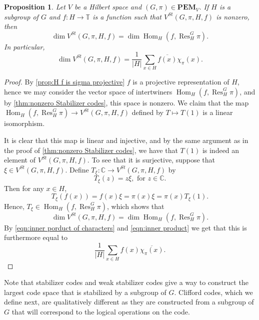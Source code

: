 \documentclass[11pt, oneside, reqno]{amsart}
\newcommand{\bbC}{\mathbb{C}}
\newcommand{\bbT}{\mathbb{T}}
\newcommand{\PEM}{\mathbf{PEM}}
\newcommand{\Hom}{\operatorname{Hom}}
\newcommand{\Res}{\operatorname{Res}}
\theoremstyle{definition}
\theoremstyle{plain}
\newtheorem{proposition}[definition]{Proposition}
\theoremstyle{remark}
\begin{document}
\begin{proposition}\label{prop:dim of weak stabilizer code}
    Let $V$ be a Hilbert space and $(G,\pi) \in \PEM_V$. If $H$ is a subgroup of $G$ and $f \colon H \to \bbT$ is a function such that $V^{St}(G,\pi,H,f)$ is nonzero, then
    \begin{equation*}
        \dim V^{St}(G,\pi,H,f) = \dim \Hom_H(f, \Res^G_H \pi).
    \end{equation*}
    In particular, 
    \begin{equation*}
        \dim V^{St}(G,\pi,H,f) = \frac{1}{|H|} \sum_{x \in H} \overline{f(x)} \chi_\pi(x).
    \end{equation*}
\end{proposition}
\begin{proof}
    By \cref{prop:H f is sigma projective} $f$ is a projective representation of $H$, hence we may consider the vector space of intertwiners $\Hom_H(f, \Res^G_H \pi)$, and by \cref{thm:nonzero Stabilizer codes}, this space is nonzero. We claim that the map $\Hom_H(f, \Res^G_H \pi) \to V^{St}(G,\pi,H,f)$ defined by $T \mapsto T(1)$ is a linear isomorphism. 
    
    It is clear that this map is linear and injective, and by the same argument as in the proof of \cref{thm:nonzero Stabilizer codes}, we have that $T(1)$ is indeed an element of $V^{St}(G,\pi,H,f)$. To see that it is surjective, suppose that $\xi \in V^{St}(G,\pi,H,f)$. Define $T_\xi \colon \bbC \to V^{St}(G,\pi,H,f)$ by
    \begin{equation*}
        T_\xi(z) = z \xi, \text{ for } z \in \bbC.
    \end{equation*}
    Then for any $x \in H$,
    \begin{equation*}
        T_\xi(f(x))
        = f(x) \xi
        = \pi(x) \xi
        = \pi(x) T_\xi(1).
    \end{equation*}
    Hence, $T_\xi \in \Hom_H(f, \Res^G_H \pi)$, which shows that
    \begin{equation*}
        \dim V^{St}(G,\pi,H,f) = \dim \Hom_H(f, \Res^G_H \pi).
    \end{equation*}
    By \cref{eqn:inner porduct of characters} and \cref{eqn:inner product} we get that this is furthermore equal to
    \begin{equation*}
        \frac{1}{|H|} \sum_{x \in H}f(x)\overline{\chi_\pi(x)}.
    \end{equation*}
\end{proof}

Note that stabilizer codes and weak stabilizer codes give a way to construct the largest code space that is stabilized by a subgroup of $G$. Clifford codes, which we define next, are qualitatively different as they are constructed from a subgroup of $G$ that will correspond to the logical operations on the code.
\end{document}
